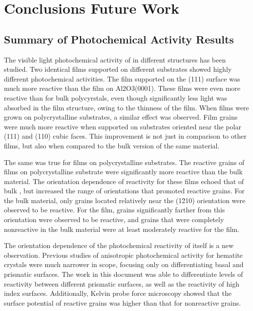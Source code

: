 
\chapter{Conclusions \oldand Future Work}
\label{ch:conclusions}


\section{Summary of Photochemical Activity Results}\label{sec:conclusions.photochemc.summary}


The visible light photochemical activity of  in different structures has been studied. Two identical  films supported on different substrates showed highly different photochemical activities. The film supported on the (111) surface was much more reactive than the film on Al2O3(0001). These films were even more reactive than for bulk  polycyrstals, even though significantly less light was absorbed in the film structure, owing to the thinness of the film. When  films were grown on polycrystalline  substrates, a similar effect was observed. Film grains were much more reactive when supported on substrates oriented near the polar (111) and (110) cubic faces. This improvement is not just in comparison to other films, but also when compared to the bulk version of the same material.

The same was true for films on polycrystalline  substrates. The reactive grains of films on polycrystalline substrate were significantly more reactive than the bulk material. The orientation dependence of reactivity for these films echoed that of bulk , but increased the range of orientations that promoted reactive grains. For the bulk material, only grains located relatively near the (1\={2}10) orientation were observed to be reactive. For the film, grains significantly farther from this orientation were observed to be reactive, and grains that were completely nonreactive in the bulk material were at least moderately reactive for the film.

The orientation dependence of the photochemical reactivity of  itself is a new observation. Previous studies of anisotropic photochemical activity for hematite crystals were much narrower in scope, focusing only on differentiating basal and prismatic surfaces. The work in this document was able to differentiate levels of reactivity between different prismatic surfaces, as well as the reactivity of high index surfaces. Additionally, Kelvin probe force microscopy showed that the surface potential of reactive grains was higher than that for nonreactive grains.


